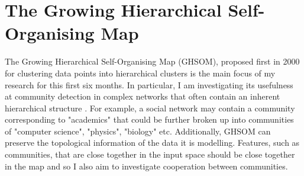 \documentclass{report}
\begin{document}
	
	
	
	
	\chapter{The Growing Hierarchical Self-Organising Map}
	
	The Growing Hierarchical Self-Organising Map (GHSOM), proposed first in 2000 \cite{dittenbach2000growing} for clustering data points into hierarchical clusters is the main focus of my research for this first six months. In particular, I am investigating its usefulness at community detection in complex networks that often contain an inherent hierarchical structure \cite{lancichinetti2009detecting}. For example, a social network may contain a community corresponding to "academics" that could be further broken up into communities of "computer science", "physics", "biology" etc. Additionally, GHSOM can preserve the topological information of the data it is modelling. Features, such as communities, that are close together in the input space should be close together in the map and so I also aim to investigate cooperation between communities. 
	
\end{document}
